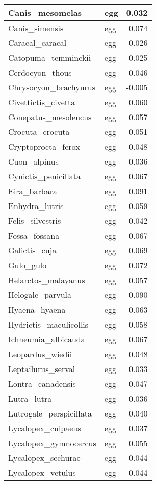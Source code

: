 \begin{table}
\begin{tabular}[t]{l|l|r}
\hline
Canis\_mesomelas & egg & 0.032\\
\hline
Canis\_simensis & egg & 0.074\\
\hline
Caracal\_caracal & egg & 0.026\\
\hline
Catopuma\_temminckii & egg & 0.025\\
\hline
Cerdocyon\_thous & egg & 0.046\\
\hline
Chrysocyon\_brachyurus & egg & -0.005\\
\hline
Civettictis\_civetta & egg & 0.060\\
\hline
Conepatus\_mesoleucus & egg & 0.057\\
\hline
Crocuta\_crocuta & egg & 0.051\\
\hline
Cryptoprocta\_ferox & egg & 0.048\\
\hline
Cuon\_alpinus & egg & 0.036\\
\hline
Cynictis\_penicillata & egg & 0.067\\
\hline
Eira\_barbara & egg & 0.091\\
\hline
Enhydra\_lutris & egg & 0.059\\
\hline
Felis\_silvestris & egg & 0.042\\
\hline
Fossa\_fossana & egg & 0.067\\
\hline
Galictis\_cuja & egg & 0.069\\
\hline
Gulo\_gulo & egg & 0.072\\
\hline
Helarctos\_malayanus & egg & 0.057\\
\hline
Helogale\_parvula & egg & 0.090\\
\hline
Hyaena\_hyaena & egg & 0.063\\
\hline
Hydrictis\_maculicollis & egg & 0.058\\
\hline
Ichneumia\_albicauda & egg & 0.067\\
\hline
Leopardus\_wiedii & egg & 0.048\\
\hline
Leptailurus\_serval & egg & 0.033\\
\hline
Lontra\_canadensis & egg & 0.047\\
\hline
Lutra\_lutra & egg & 0.036\\
\hline
Lutrogale\_perspicillata & egg & 0.040\\
\hline
Lycalopex\_culpaeus & egg & 0.037\\
\hline
Lycalopex\_gymnocercus & egg & 0.055\\
\hline
Lycalopex\_sechurae & egg & 0.044\\
\hline
Lycalopex\_vetulus & egg & 0.044\\

\end{tabular}
\end{table}
